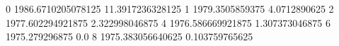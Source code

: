 0 1986.6710205078125 11.3917236328125
1 1979.3505859375 4.0712890625
2 1977.602294921875 2.322998046875
4 1976.586669921875 1.307373046875
6 1975.279296875 0.0
8 1975.383056640625 0.103759765625

